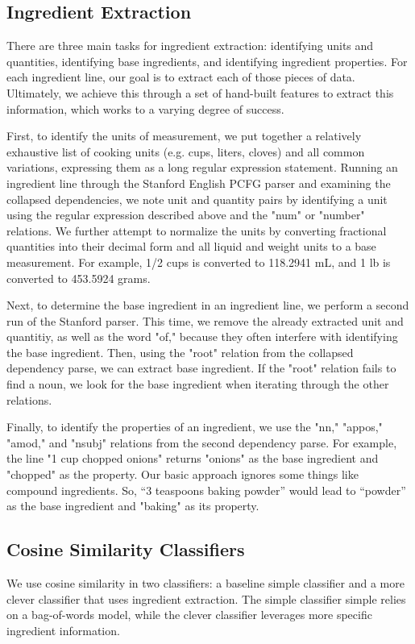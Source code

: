 \documentclass[11pt]{article}
\begin{document}
\subsection{Ingredient Extraction}
There are three main tasks for ingredient extraction: identifying units and quantities, identifying base ingredients, and identifying ingredient properties. For each ingredient line, our goal is to extract each of those pieces of data. Ultimately, we achieve this through a set of hand-built features to extract this information, which works to a varying degree of success. 

First, to identify the units of measurement, we put together a relatively exhaustive list of cooking units (e.g. cups, liters, cloves) and all common variations, expressing them as a long regular expression statement. Running an ingredient line through the Stanford English PCFG parser and examining the collapsed dependencies, we note unit and quantity pairs by identifying a unit using the regular expression described above and the "num" or "number" relations. We further attempt to normalize the units by converting fractional quantities into their decimal form and all liquid and weight units to a base measurement. For example, 1/2 cups is converted to 118.2941 mL, and 1 lb is converted to 453.5924 grams. 

Next, to determine the base ingredient in an ingredient line, we perform a second run of the Stanford parser. This time, we remove the already extracted unit and quantitiy, as well as the word "of," because they often interfere with identifying the base ingredient. Then, using the "root" relation from the collapsed dependency parse, we can extract base ingredient. If the "root" relation fails to find a noun, we look for the base ingredient when iterating through the other relations. 

Finally, to identify the properties of an ingredient, we use the "nn," "appos," "amod," and "nsubj" relations from the second dependency parse. For example, the line "1 cup chopped onions" returns "onions" as the base ingredient and "chopped" as the property. Our basic approach ignores some things like compound ingredients. So, “3 teaspoons baking powder” would lead to “powder” as the base ingredient and "baking" as its property.

\subsection{Cosine Similarity Classifiers}
We use cosine similarity in two classifiers: a baseline simple classifier and a more clever classifier that uses ingredient extraction. The simple classifier simple relies on a bag-of-words model, while the clever classifier leverages more specific ingredient information. 
\end{document}
